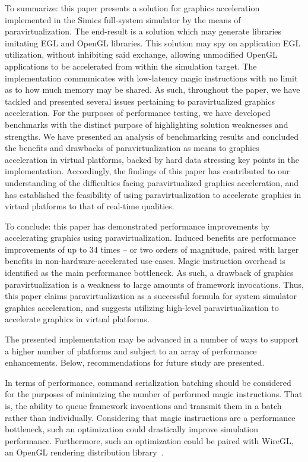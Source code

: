 \documentclass{article}
\newcommand{\masccite}[2][]{\cite{#2}}
\begin{document}
To summarize: this paper presents a solution for graphics acceleration implemented in the Simics full-system simulator by the means of paravirtualization.
The end-result is a solution which may generate libraries imitating EGL and OpenGL libraries.
This solution may spy on application EGL utilization, without inhibiting said exchange, allowing unmodified OpenGL applications to be accelerated from within the simulation target.
The implementation communicates with low-latency magic instructions with no limit as to how much memory may be shared.
As such, throughout the paper, we have tackled and presented several issues pertaining to paravirtualized graphics acceleration.
For the purposes of performance testing, we have developed benchmarks with the distinct purpose of highlighting solution weaknesses and strengths.
We have presented an analysis of benchmarking results and concluded the benefits and drawbacks of paravirtualization as means to graphics acceleration in virtual platforms, backed by hard data stressing key points in the implementation.
Accordingly, the findings of this paper has contributed to our understanding of the difficulties facing paravirtualized graphics acceleration, and has established the feasibility of using paravirtualization to accelerate graphics in virtual platforms to that of real-time qualities.

To conclude: this paper has demonstrated performance improvements by accelerating graphics using paravirtualization.
Induced benefits are performance improvements of up to $34$ times -- or two orders of magnitude, paired with larger benefits in non-hardware-accelerated use-cases.
Magic instruction overhead is identified as the main performance bottleneck.
As such, a drawback of graphics paravirtualization is a weakness to large amounts of framework invocations.
Thus, this paper claims paravirtualization as a successful formula for system simulator graphics acceleration, and suggests utilizing high-level paravirtualization to accelerate graphics in virtual platforms.

The presented implementation may be advanced in a number of ways to support a higher number of platforms and subject to an array of performance enhancements.
Below, recommendations for future study are presented.

In terms of performance, command serialization batching should be considered for the purposes of minimizing the number of performed magic instructions.
That is, the ability to queue framework invocations and transmit them in a batch rather than individually.
Considering that magic instructions are a performance bottleneck, such an optimization could drastically improve simulation performance.
Furthermore, such an optimization could be paired with WireGL, an OpenGL rendering distribution library~\masccite{web:stanford:2015}.
\end{document}
